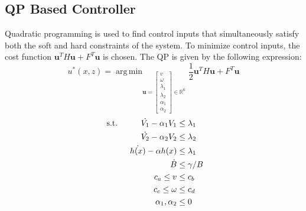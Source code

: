\documentclass[conference]{IEEEtran}
\DeclareMathOperator*{\argmin}{arg\,min}
\begin{document}
\subsection{QP Based Controller}
Quadratic programming is used to find control inputs that simultaneously satisfy both the soft and hard constraints of the system. To minimize control inputs, the cost function $\textbf{u}^TH\textbf{u}+F^T\textbf{u}$ is chosen. The QP is given by the following expression:
\begin{equation}
u^*(x,z) = \argmin_{\textbf{u}=
\left[\begin{matrix}
v\\
\omega\\
\lambda_1\\
\lambda_2\\
\alpha_1\\
\alpha_2
\end{matrix}\right]
\in \mathbb{R}^6}
\frac{1}{2}\textbf{u}^TH\textbf{u}+F^T\textbf{u} 
\label{QP}
\end{equation}
\begin{align}
\text{ s.t.\hspace{1cm}}
\dot{V_1} -\alpha_1 V_1 & \leq\lambda_1\\
\dot{V_2} -\alpha_2 V_2 & \leq\lambda_2\\
\dot{h(x)}-\alpha h(x) & \leq \lambda_1\\
\dot{B} & \leq \gamma/B\\
c_a \leq v & \leq c_b\\
c_c\leq \omega & \leq c_d\\
\alpha_1,\alpha_2 & \leq 0
\end{align}
\end{document}

